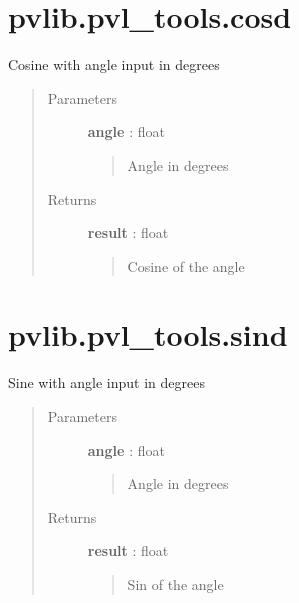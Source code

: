 \documentclass[letterpaper,10pt,english]{sphinxmanual}
\begin{document}
\section{pvlib.pvl\_tools.cosd}
\label{stubs/pvlib.pvl_tools.cosd::doc}\label{stubs/pvlib.pvl_tools.cosd:pvlib-pvl-tools-cosd}

\begin{fulllineitems}
\label{stubs/pvlib.pvl_tools.cosd:pvlib.pvl_tools.cosd}
Cosine with angle input in degrees
\begin{quote}\begin{description}
\item[{Parameters}] \leavevmode
\textbf{angle} : float
\begin{quote}

Angle in degrees
\end{quote}

\item[{Returns}] \leavevmode
\textbf{result} : float
\begin{quote}

Cosine of the angle
\end{quote}

\end{description}\end{quote}

\end{fulllineitems}



\section{pvlib.pvl\_tools.sind}
\label{stubs/pvlib.pvl_tools.sind:pvlib-pvl-tools-sind}\label{stubs/pvlib.pvl_tools.sind::doc}

\begin{fulllineitems}
\label{stubs/pvlib.pvl_tools.sind:pvlib.pvl_tools.sind}
Sine with angle input in degrees
\begin{quote}\begin{description}
\item[{Parameters}] \leavevmode
\textbf{angle} : float
\begin{quote}

Angle in degrees
\end{quote}

\item[{Returns}] \leavevmode
\textbf{result} : float
\begin{quote}

Sin of the angle
\end{quote}

\end{description}\end{quote}

\end{fulllineitems}
\end{document}

